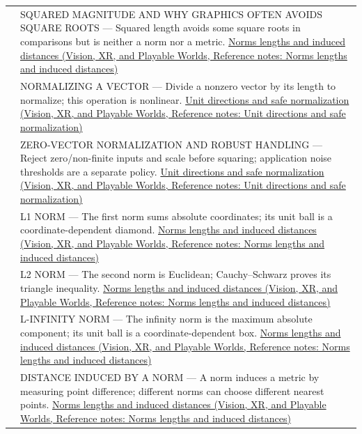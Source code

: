 {\begin{longtable}[]{@{}
  >{\raggedright\arraybackslash}p{}
  >{\raggedright\arraybackslash}p{}@{}}
527 & SQUARED MAGNITUDE AND WHY GRAPHICS OFTEN AVOIDS SQUARE ROOTS --- Squared length avoids some square roots in comparisons but is neither a norm nor a metric. \href{../07-Vision-XR-and-Playable-Worlds/main.pdf\#nameddest=appendix-49933872bb51}{Norms lengths and induced distances (Vision, XR, and Playable Worlds, Reference notes: Norms lengths and induced distances)} \\
528 & NORMALIZING A VECTOR --- Divide a nonzero vector by its length to normalize; this operation is nonlinear. \href{../07-Vision-XR-and-Playable-Worlds/main.pdf\#nameddest=appendix-f744e41b95b4}{Unit directions and safe normalization (Vision, XR, and Playable Worlds, Reference notes: Unit directions and safe normalization)} \\
529 & ZERO-VECTOR NORMALIZATION AND ROBUST HANDLING --- Reject zero/non-finite inputs and scale before squaring; application noise thresholds are a separate policy. \href{../07-Vision-XR-and-Playable-Worlds/main.pdf\#nameddest=appendix-f744e41b95b4}{Unit directions and safe normalization (Vision, XR, and Playable Worlds, Reference notes: Unit directions and safe normalization)} \\
530 & L1 NORM --- The first norm sums absolute coordinates; its unit ball is a coordinate-dependent diamond. \href{../07-Vision-XR-and-Playable-Worlds/main.pdf\#nameddest=appendix-49933872bb51}{Norms lengths and induced distances (Vision, XR, and Playable Worlds, Reference notes: Norms lengths and induced distances)} \\
531 & L2 NORM --- The second norm is Euclidean; Cauchy--Schwarz proves its triangle inequality. \href{../07-Vision-XR-and-Playable-Worlds/main.pdf\#nameddest=appendix-49933872bb51}{Norms lengths and induced distances (Vision, XR, and Playable Worlds, Reference notes: Norms lengths and induced distances)} \\
532 & L-INFINITY NORM --- The infinity norm is the maximum absolute component; its unit ball is a coordinate-dependent box. \href{../07-Vision-XR-and-Playable-Worlds/main.pdf\#nameddest=appendix-49933872bb51}{Norms lengths and induced distances (Vision, XR, and Playable Worlds, Reference notes: Norms lengths and induced distances)} \\
533 & DISTANCE INDUCED BY A NORM --- A norm induces a metric by measuring point difference; different norms can choose different nearest points. \href{../07-Vision-XR-and-Playable-Worlds/main.pdf\#nameddest=appendix-49933872bb51}{Norms lengths and induced distances (Vision, XR, and Playable Worlds, Reference notes: Norms lengths and induced distances)} \\

\end{longtable}}
